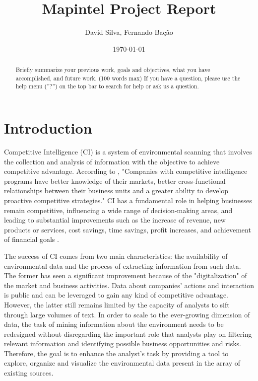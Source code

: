 \documentclass[a4paper]{article}
\title{Mapintel Project Report}
\author{David Silva, Fernando Bação}
\date{\today}
\begin{document}
\maketitle

\begin{abstract}
	Briefly summarize your previous work, goals and objectives, what you have accomplished, and future work. (100 words max) If you have a question, please use the help menu (''?'') on the top bar to search for help or ask us a question.
\end{abstract}

\section*{Introduction}
Competitive Intelligence (CI) is a system of environmental scanning that involves the collection and analysis of information with the objective to achieve competitive advantage. According to \citet{brod1999}, "Companies with competitive intelligence programs have better knowledge of their markets, better cross-functional relationships between their business units and a greater ability to develop proactive competitive strategies." CI has a fundamental role in helping businesses remain competitive, influencing a wide range of decision-making areas, and leading to substantial improvements such as the increase of revenue, new products or services, cost savings, time savings, profit increases, and achievement of financial goals \citep{calof2017}.

The success of CI comes from two main characteristics: the availability of environmental data and the process of extracting information from such data. The former has seen a significant improvement because of the "digitalization" of the market and business activities. Data about companies' actions and interaction is public and can be leveraged to gain any kind of competitive advantage. However, the latter still remains limited by the capacity of analysts to sift through large volumes of text. In order to scale to the ever-growing dimension of data, the task of mining information about the environment needs to be redesigned without disregarding the important role that analysts play on filtering relevant information and identifying possible business opportunities and risks. Therefore, the goal is to enhance the analyst's task by providing a tool to explore, organize and visualize the environmental data present in the array of existing sources.
\end{document}
